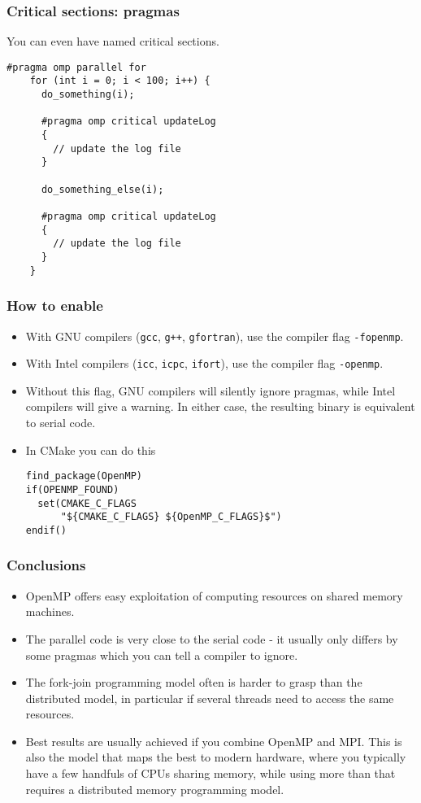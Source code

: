 \begin{frame}[fragile]
  \frametitle{Critical sections: pragmas}
  You can even have named critical sections.
  \begin{lstlisting}[style=c, basicstyle=\ttfamily\footnotesize]
    #pragma omp parallel for
    for (int i = 0; i < 100; i++) {
      do_something(i);

      #pragma omp critical updateLog
      {
        // update the log file
      }

      do_something_else(i);

      #pragma omp critical updateLog
      {
        // update the log file
      }
    }
  \end{lstlisting}
\end{frame}

\begin{frame}[fragile]
  \frametitle{How to enable}
  \begin{itemize}
  \item With GNU compilers (\texttt{gcc}, \texttt{g++}, \texttt{gfortran}), use
    the compiler flag \texttt{-fopenmp}.
  \item With Intel compilers (\texttt{icc}, \texttt{icpc}, \texttt{ifort}), use
    the compiler flag \texttt{-openmp}.
  \item Without this flag, GNU compilers will silently ignore pragmas, while
    Intel compilers will give a warning. In either case, the resulting binary is
    equivalent to serial code.
  \item In CMake you can do this
    \begin{lstlisting}[basicstyle=\ttfamily\footnotesize]
find_package(OpenMP)
if(OPENMP_FOUND)
  set(CMAKE_C_FLAGS
      "${CMAKE_C_FLAGS} ${OpenMP_C_FLAGS}$")
endif()
    \end{lstlisting}
  \end{itemize}
\end{frame}

\begin{frame}
  \frametitle{Conclusions}
  \begin{itemize}
  \item OpenMP offers easy exploitation of computing resources on shared memory
    machines.
  \item The parallel code is very close to the serial code - it usually only
    differs by some pragmas which you can tell a compiler to ignore.
  \item The fork-join programming model often is harder to grasp than the
    distributed model, in particular if several threads need to access the same
    resources.
  \item Best results are usually achieved if you combine OpenMP and MPI. This is
    also the model that maps the best to modern hardware, where you typically
    have a few handfuls of CPUs sharing memory, while using more than that
    requires a distributed memory programming model.
  \end{itemize}
\end{frame}

